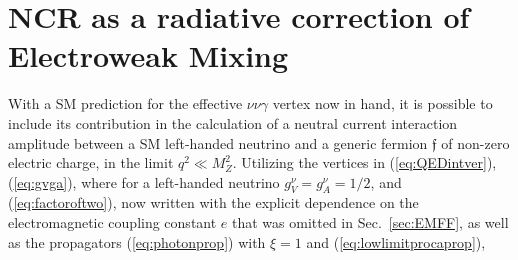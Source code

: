 \section{NCR as a radiative correction of Electroweak Mixing}\label{sec:NCRassin}
With a SM prediction for the effective $\nu\nu\gamma$ vertex now in hand, it is possible to include its contribution in the calculation of a neutral current interaction amplitude between a SM left-handed neutrino and a generic fermion $\mathfrak{f}$ of non-zero electric charge, in the limit $q^2 \ll M_Z^2$. Utilizing the vertices in (\ref{eq:QEDintver}), (\ref{eq:gvga}), where for a left-handed neutrino $g^\nu_V = g^\nu_A = 1/2$, and (\ref{eq:factoroftwo}), now written with the explicit dependence on the electromagnetic coupling constant $e$ that was omitted in Sec.~\ref{sec:EMFF}, as well as the propagators (\ref{eq:photonprop}) with $\xi = 1$ and (\ref{eq:lowlimitprocaprop}),

